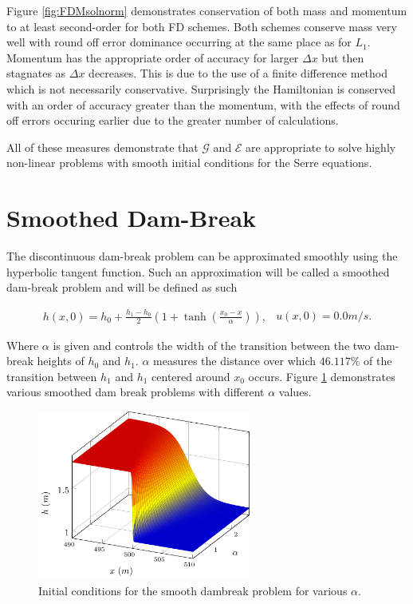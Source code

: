 \documentclass[SingleSpace,12pt,Proceedings]{Serre_ASCE}
\begin{document}
Figure \ref{fig:FDMsolnorm} demonstrates conservation of both mass and momentum to at least second-order for both FD schemes. Both schemes conserve mass very well with round off error dominance occurring at the same place as for $L_1$. Momentum has the appropriate order of accuracy for larger $\Delta x$ but then stagnates as $\Delta x$ decreases. This is due to the use of a finite difference method which is not necessarily conservative. Surprisingly the Hamiltonian is conserved with an order of accuracy greater than the momentum, with the effects of round off errors occuring earlier due to the greater number of calculations.

All of these measures demonstrate that $\mathcal{G}$ and $\mathcal{E}$ are appropriate to solve highly non-linear problems with smooth initial conditions for the Serre equations. 

\section{Smoothed Dam-Break}
\label{section:smootheddambreak}
The discontinuous dam-break problem can be approximated smoothly using the hyperbolic tangent function. Such an approximation will be called a smoothed dam-break problem and will be defined as such
\begin{linenomath*}
\begin{subequations}
\begin{gather}
h(x,0) = h_0 + \frac{h_1 - h_0}{2}\left(1 + \tanh\left(\frac{x_0 - x}{\alpha}\right)\right),
\end{gather}
\begin{gather}
u(x,0) = 0.0m/s.
\end{gather}
\end{subequations}
\label{eq:sdbi}
\end{linenomath*}
Where $\alpha$ is given and controls the width of the transition between the two dam-break heights of $h_0$ and $h_1$. $\alpha$ measures the distance over which $46.117\%$ of the transition between $h_1$ and $h_1$ centered around $x_0$ occurs. Figure \ref{fig:dbsmoothinit} demonstrates various smoothed dam break problems with different $\alpha$ values.
\begin{figure}
\centering
\includegraphics[width=7cm]{pics/explainers/dbsmooth.pdf}
\caption{Initial conditions for the smooth dambreak problem for various $\alpha$.}
\label{fig:dbsmoothinit}
\end{figure}
%
\end{document}
